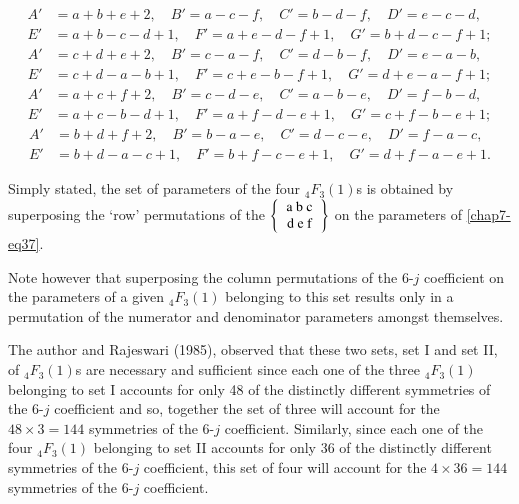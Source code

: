 {\fontsize{9.4pt}{11pt}\selectfont
\begin{equation}
\begin{split}
A' & = a+b+e+2, \quad B'=a-c-f, \quad C'=b-d-f, \quad D'=e-c-d,\\
E' & = a+b-c-d+1, \quad F'=a+e-d-f+1, \quad G'=b+d-c-f+1;\label{chap7-eq38}
\end{split}
\end{equation}
\begin{equation}
\begin{split}
A' & = c+d+e+2, \quad B'=c-a-f, \quad C'=d-b-f, \quad D'=e-a-b,\\
E' & = c+d-a-b+1, \quad F'=c+e-b-f+1, \quad G'=d+e-a-f+1;\label{chap7-eq39}
\end{split}
\end{equation}
\begin{equation}
\begin{split}
A' & = a+c+f+2, \quad B'=c-d-e, \quad C'=a-b-e, \quad D'=f-b-d,\\
E' & = a+c-b-d+1, \quad F'=a+f-d-e+1, \quad G'=c+f-b-e+1; \label{chap7-eq40}
\end{split}
\end{equation}
\begin{equation}
\begin{split}
A' & = b+d+f+2, \quad B'=b-a-e, \quad C'=d-c-e, \quad D'=f-a-c,\\
E' & = b+d-a-c+1, \quad F'=b+f-c-e+1, \quad G'=d+f-a-e+1. \label{chap7-eq41}
\end{split}
\end{equation}}\relax

Simply stated, the set of parameters of the four $_4F_3(1)$s is obtained by superposing the `row' permutations of the $\left\{ \begin{tabular} {c} a\ b\ c\\ d\ e\ f \\ \end{tabular} \right\}$ on the parameters of \eqref{chap7-eq37}.

Note however that superposing the column permutations of the 6-$j$ coefficient on the parameters of a given $_4F_3(1)$ belonging to this set results only in a permutation of the numerator and denominator parameters amongst themselves.

The author and Rajeswari (1985), observed that these two sets, set I and set II, of $_4F_3(1)$s are necessary and sufficient since each one of the three $_4F_3(1)$ belonging to set I accounts for only 48 of the distinctly different symmetries of the 6-$j$ coefficient and so, together the set of three will account for the $48\times 3 = 144$ symmetries of the 6-$j$ coefficient. Similarly, since each one of the four $_4F_3(1)$ belonging to set II accounts for only 36 of the distinctly different symmetries of the 6-$j$ coefficient, this set of four will account for the $4\times 36 = 144$ symmetries of the 6-$j$ coefficient.


